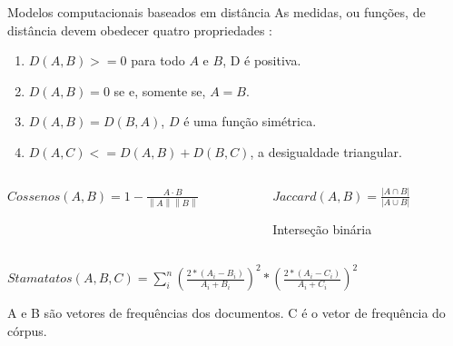 \begin{frame}{Modelos computacionais baseados em distância}
\selectFont
	As medidas, ou funções, de distância devem obedecer quatro propriedades \cite{deza2009encyclopedia}:
	\begin{enumerate}\selectFont
		\item $D(A,B) >= 0 $ para todo $A$ e $B$, D é positiva.
		\item $D(A,B) = 0 $ se e, somente se, $A = B$.
		\item $D(A,B) = D(B,A) $, $D$ é uma função simétrica.
		\item $D(A, C) <= D(A, B) + D(B, C)$, a desigualdade triangular.
	\end{enumerate}


	\begin{columns}
	\begin{column}{0.48\textwidth}
		\begin{tcolorbox}[colback=red!5!white,colframe=red!75!black,title=Distância de cosseno,height=2cm,valign=center]\selectFont
			$
			Cossenos \left ( A,B \right ) = 1 -\frac{A\cdot B}{\left \| A \right \| \left \| B \right \|}
			$            
		\end{tcolorbox}
	\end{column}
	\begin{column}{0.48\textwidth}\selectFont
			\begin{tcolorbox}[colback=blue!5!white,colframe=blue!75!black,title=Jaccard,height=2cm,valign=center]\selectFont
				$
				Jaccard(A,B) = \frac{\left | A \cap B \right |}{\left | A \cup B \right |}
				$
				
				Interseção binária
			\end{tcolorbox}
	\end{column}
	\end{columns}

	\begin{tcolorbox}[title=Stamatatos,height=2cm,valign=center]\selectFont
			$
Stamatatos (A,B, C) = \sum_i^n \left ( \frac{ 2*\left(A_i-B_i \right ) }{A_i+B_i}\right )^{2} * \left ( \frac{ 2*\left(A_i-C_i \right ) }{A_i+C_i}\right )^{2}
			$      
	\end{tcolorbox}

A e B são vetores de frequências dos documentos. C é o vetor de frequência do córpus.

\end{frame}


